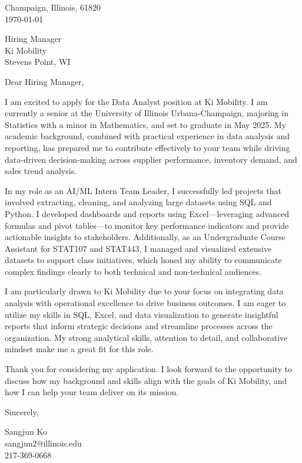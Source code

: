 \documentclass[11pt]{article}
\begin{document}
\noindent
Champaign, Illinois, 61820 \\
\today
\vspace{2em}

\noindent
Hiring Manager\\
Ki Mobility\\
Stevens Point, WI



\vspace{1.5em}

Dear Hiring Manager,

I am excited to apply for the Data Analyst position at Ki Mobility. I am currently a senior at the University of Illinois Urbana-Champaign, majoring in Statistics with a minor in Mathematics, and set to graduate in May 2025. My academic background, combined with practical experience in data analysis and reporting, has prepared me to contribute effectively to your team while driving data-driven decision-making across supplier performance, inventory demand, and sales trend analysis.

In my role as an AI/ML Intern Team Leader, I successfully led projects that involved extracting, cleaning, and analyzing large datasets using SQL and Python. I developed dashboards and reports using Excel—leveraging advanced formulas and pivot tables—to monitor key performance indicators and provide actionable insights to stakeholders. Additionally, as an Undergraduate Course Assistant for STAT107 and STAT443, I managed and visualized extensive datasets to support class initiatives, which honed my ability to communicate complex findings clearly to both technical and non-technical audiences.

I am particularly drawn to Ki Mobility due to your focus on integrating data analysis with operational excellence to drive business outcomes. I am eager to utilize my skills in SQL, Excel, and data visualization to generate insightful reports that inform strategic decisions and streamline processes across the organization. My strong analytical skills, attention to detail, and collaborative mindset make me a great fit for this role.

Thank you for considering my application. I look forward to the opportunity to discuss how my background and skills align with the goals of Ki Mobility, and how I can help your team deliver on its mission.
\vspace{1em}

Sincerely,

\vspace{2em}

\noindent
Sangjun Ko\\
sangjun2@illinois.edu\\
217-369-0668
\end{document}
